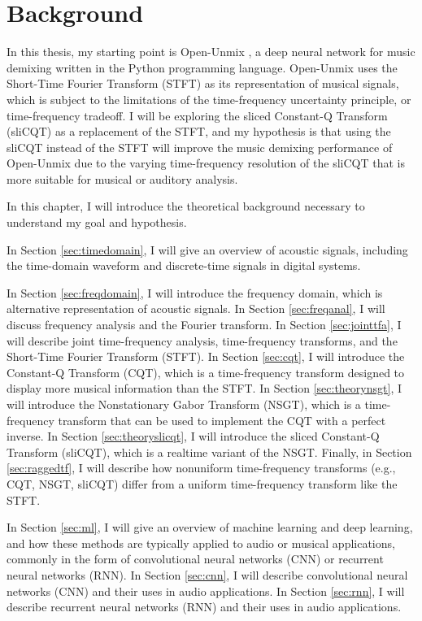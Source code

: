 \documentclass[report.tex]{subfiles}
\begin{document}
\section{Background}
\label{sec:background}

In this thesis, my starting point is Open-Unmix \parencite{umx}, a deep neural network for music demixing written in the Python programming language. Open-Unmix uses the Short-Time Fourier Transform (STFT) as its representation of musical signals, which is subject to the limitations of the time-frequency uncertainty principle, or time-frequency tradeoff. I will be exploring the sliced Constant-Q Transform (sliCQT) as a replacement of the STFT, and my hypothesis is that using the sliCQT instead of the STFT will improve the music demixing performance of Open-Unmix due to the varying time-frequency resolution of the sliCQT that is more suitable for musical or auditory analysis.

In this chapter, I will introduce the theoretical background necessary to understand my goal and hypothesis.

In Section \ref{sec:timedomain}, I will give an overview of acoustic signals, including the time-domain waveform and discrete-time signals in digital systems.

In Section \ref{sec:freqdomain}, I will introduce the frequency domain, which is alternative representation of acoustic signals. In Section \ref{sec:freqanal}, I will discuss frequency analysis and the Fourier transform. In Section \ref{sec:jointtfa}, I will describe joint time-frequency analysis, time-frequency transforms, and the Short-Time Fourier Transform (STFT). In Section \ref{sec:cqt}, I will introduce the Constant-Q Transform (CQT), which is a time-frequency transform designed to display more musical information than the STFT. In Section \ref{sec:theorynsgt}, I will introduce the Nonstationary Gabor Transform (NSGT), which is a time-frequency transform that can be used to implement the CQT with a perfect inverse. In Section \ref{sec:theoryslicqt}, I will introduce the sliced Constant-Q Transform (sliCQT), which is a realtime variant of the NSGT. Finally, in Section \ref{sec:raggedtf}, I will describe how nonuniform time-frequency transforms (e.g., CQT, NSGT, sliCQT) differ from a uniform time-frequency transform like the STFT.

In Section \ref{sec:ml}, I will give an overview of machine learning and deep learning, and how these methods are typically applied to audio or musical applications, commonly in the form of convolutional neural networks (CNN) or recurrent neural networks (RNN). In Section \ref{sec:cnn}, I will describe convolutional neural networks (CNN) and their uses in audio applications. In Section \ref{sec:rnn}, I will describe recurrent neural networks (RNN) and their uses in audio applications.
\end{document}
